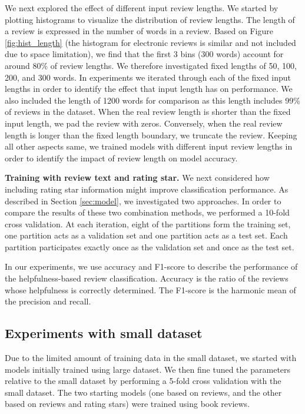 \documentclass[conference,compsoc]{IEEEtran}
\begin{document}
We next explored the effect of different input review lengths. We started by plotting histograms to visualize the distribution of review lengths. The length of a review is expressed in the number of words in a review. Based on Figure \ref{fig:hist_length} (the histogram for electronic reviews is similar and not included due to space limitation), we find that the first 3 bins (300 words) account for around 80\% of review lengths. We therefore investigated fixed lengths of 50, 100, 200, and 300 words. In experiments we iterated through each of the fixed input lengths in order to identify the effect that input length has on performance. We also included the length of 1200 words for comparison as this length includes 99\% of reviews in the dataset. When the real review length is shorter than the fixed input length, we pad the review with zeros. Conversely, when the real review length is longer than the fixed length boundary, we truncate the review. Keeping all other aspects same, we trained models with different input review lengths in order to identify the impact of review length on model accuracy.

\textbf{Training with review text and rating star.} We next considered how including rating star information might improve classification performance. As described in Section \ref{sec:model}, we investigated two approaches. In order to compare the results of these two combination methods, we performed a 10-fold cross validation. At each iteration, eight of the partitions form the training set, one partition acts as a validation set and one partition acts as a test set. Each partition participates exactly once as the validation set and once as the test set.

In our experiments, we use accuracy and F1-score to describe the performance of the helpfulness-based review classification. Accuracy is the ratio of the reviews whose helpfulness is correctly determined. The F1-score is the harmonic mean of the precision and recall. 

\subsection{Experiments with small dataset}
Due to the limited amount of training data in the small dataset, we started with models initially trained using large dataset. We then fine tuned the parameters relative to the small dataset by performing a 5-fold cross validation with the small dataset. The two starting models (one based on reviews, and the other based on reviews and rating stars) were trained using book reviews.
\end{document}
